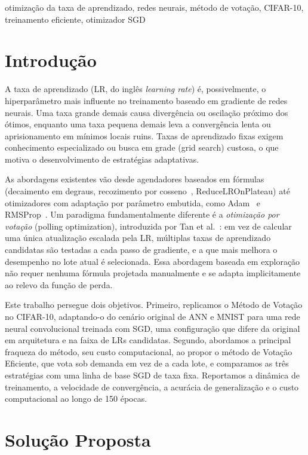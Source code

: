 \documentclass[conference]{IEEEtran}
\begin{document}
\begin{IEEEkeywords}
otimização da taxa de aprendizado, redes neurais, método de votação, CIFAR-10, treinamento eficiente, otimizador SGD
\end{IEEEkeywords}

\section{Introdução}

A taxa de aprendizado (LR, do inglês \emph{learning rate}) é, possivelmente, o hiperparâmetro mais influente no treinamento baseado em gradiente de redes neurais. Uma taxa grande demais causa divergência ou oscilação próximo dos ótimos, enquanto uma taxa pequena demais leva a convergência lenta ou aprisionamento em mínimos locais ruins. Taxas de aprendizado fixas exigem conhecimento especializado ou busca em grade (grid search) custosa, o que motiva o desenvolvimento de estratégias adaptativas.

As abordagens existentes vão desde agendadores baseados em fórmulas (decaimento em degraus, recozimento por cosseno~\cite{loshchilov2017sgdr}, ReduceLROnPlateau) até otimizadores com adaptação por parâmetro embutida, como Adam~\cite{kingma2015adam} e RMSProp~\cite{tieleman2012rmsprop}. Um paradigma fundamentalmente diferente é a \emph{otimização por votação} (polling optimization), introduzida por Tan et al.~\cite{tan2025polling}: em vez de calcular uma única atualização escalada pela LR, múltiplas taxas de aprendizado candidatas são testadas a cada passo de gradiente, e a que mais melhora o desempenho no lote atual é selecionada. Essa abordagem baseada em exploração não requer nenhuma fórmula projetada manualmente e se adapta implicitamente ao relevo da função de perda.

Este trabalho persegue dois objetivos. Primeiro, replicamos o Método de Votação no CIFAR-10, adaptando-o do cenário original de ANN e MNIST para uma rede neural convolucional treinada com SGD, uma configuração que difere da original em arquitetura e na faixa de LRs candidatas. Segundo, abordamos a principal fraqueza do método, seu custo computacional, ao propor o método de Votação Eficiente, que vota sob demanda em vez de a cada lote, e comparamos as três estratégias com uma linha de base SGD de taxa fixa. Reportamos a dinâmica de treinamento, a velocidade de convergência, a acurácia de generalização e o custo computacional ao longo de 150 épocas.

\section{Solução Proposta}
\end{document}
